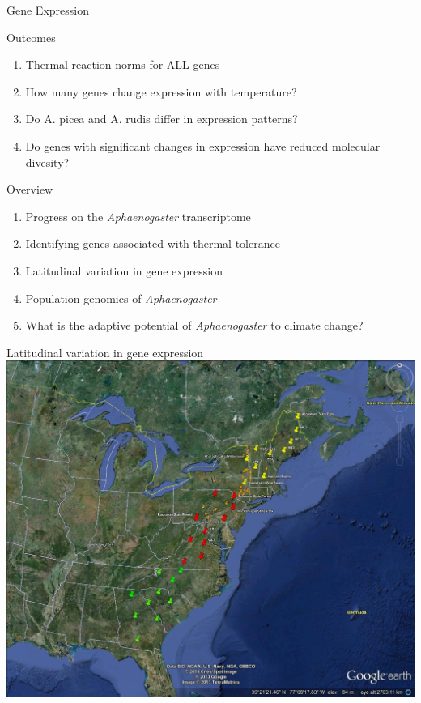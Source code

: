 \documentclass{beamer}
\begin{document}
\begin{frame}{Gene Expression}
	\begin{block}{Outcomes}
		\begin{enumerate}
			\item Thermal reaction norms for ALL genes
			\item How many genes change expression with temperature?
			\item Do A. picea and A. rudis differ in expression patterns?
			\item Do genes with significant changes in expression have reduced molecular divesity?
		\end{enumerate}
	\end{block}


\end{frame}

\begin{frame}{Overview}
	\begin{enumerate}
  		\item Progress on the \textit{Aphaenogaster} transcriptome
	  	\item Identifying genes associated with thermal tolerance
		\item<1-| alert@1> Latitudinal variation in gene expression
	  	\item<1-| alert@1> Population genomics of \textit{Aphaenogaster}
  		\item What is the adaptive potential of \textit{Aphaenogaster} to climate change?
	  \end{enumerate}
\end{frame}


\begin{frame}{Latitudinal variation in gene expression}
	\includegraphics[width=\textwidth, height=\textheight, keepaspectratio]{Aphaenogaster2013_sampling_locations_20130313.jpg}
\end{frame}
\end{document}

